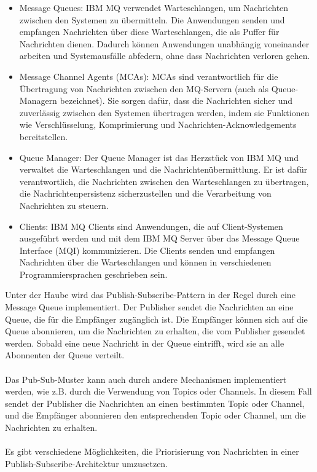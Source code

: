 \begin{itemize}
\item Message Queues: IBM MQ verwendet Warteschlangen, um Nachrichten zwischen den Systemen zu übermitteln. Die Anwendungen senden und empfangen Nachrichten über diese Warteschlangen, die als Puffer für Nachrichten dienen. Dadurch können Anwendungen unabhängig voneinander arbeiten und Systemausfälle abfedern, ohne dass Nachrichten verloren gehen.
\item Message Channel Agents (MCAs): MCAs sind verantwortlich für die Übertragung von Nachrichten zwischen den MQ-Servern (auch als Queue-Managern bezeichnet). Sie sorgen dafür, dass die Nachrichten sicher und zuverlässig zwischen den Systemen übertragen werden, indem sie Funktionen wie Verschlüsselung, Komprimierung und Nachrichten-Acknowledgements bereitstellen.
\item Queue Manager: Der Queue Manager ist das Herzstück von IBM MQ und verwaltet die Warteschlangen und die Nachrichtenübermittlung. Er ist dafür verantwortlich, die Nachrichten zwischen den Warteschlangen zu übertragen, die Nachrichtenpersistenz sicherzustellen und die Verarbeitung von Nachrichten zu steuern.
\item Clients: IBM MQ Clients sind Anwendungen, die auf Client-Systemen ausgeführt werden und mit dem IBM MQ Server über das Message Queue Interface (MQI) kommunizieren. Die Clients senden und empfangen Nachrichten über die Warteschlangen und können in verschiedenen Programmiersprachen geschrieben sein.
\end{itemize}

Unter der Haube wird das Publish-Subscribe-Pattern in der Regel durch eine Message Queue implementiert. Der Publisher sendet die Nachrichten an eine Queue, die für die Empfänger zugänglich ist. Die Empfänger können sich auf die Queue abonnieren, um die Nachrichten zu erhalten, die vom Publisher gesendet werden. Sobald eine neue Nachricht in der Queue eintrifft, wird sie an alle Abonnenten der Queue verteilt.
\\\\
Das Pub-Sub-Muster kann auch durch andere Mechanismen implementiert werden, wie z.B. durch die Verwendung von Topics oder Channels. In diesem Fall sendet der Publisher die Nachrichten an einen bestimmten Topic oder Channel, und die Empfänger abonnieren den entsprechenden Topic oder Channel, um die Nachrichten zu erhalten.
\\\\
Es gibt verschiedene Möglichkeiten, die Priorisierung von Nachrichten in einer Publish-Subscribe-Architektur umzusetzen.

